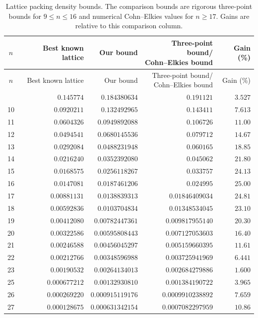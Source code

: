 \documentclass[11pt]{article}
\begin{document}
\begingroup
\small
\setlength{\tabcolsep}{4pt}
\begin{longtable}{crrrr}
\caption{Lattice packing density bounds. The comparison bounds are rigorous
three-point bounds for $9\le n\le16$ and numerical Cohn--Elkies values for
$n\ge17$. Gains are relative to this comparison column.}\label{tab:results}\\
\toprule $n$ & Best known lattice & Our bound & \shortstack{Three-point bound/\\Cohn--Elkies bound} & Gain (\%)\\\midrule
\endfirsthead
\toprule $n$ & Best known lattice & Our bound & \shortstack{Three-point bound/\\Cohn--Elkies bound} & Gain (\%)\\\midrule
\endhead
\bottomrule\endfoot
9 & $0.145774$ & $0.184380634$ & $0.191121$ & $3.527$\\
10 & $0.0920211$ & $0.132492965$ & $0.143411$ & $7.613$\\
11 & $0.0604326$ & $0.0949892088$ & $0.106726$ & $11.00$\\
12 & $0.0494541$ & $0.0680145536$ & $0.079712$ & $14.67$\\
13 & $0.0292084$ & $0.0488231948$ & $0.060165$ & $18.85$\\
14 & $0.0216240$ & $0.0352392080$ & $0.045062$ & $21.80$\\
15 & $0.0168575$ & $0.0256118267$ & $0.033757$ & $24.13$\\
16 & $0.0147081$ & $0.0187461206$ & $0.024995$ & $25.00$\\
17 & $0.00881131$ & $0.0138839313$ & $0.01846409034$ & $24.81$\\
18 & $0.00592836$ & $0.0103704834$ & $0.01348534045$ & $23.10$\\
19 & $0.00412080$ & $0.00782447361$ & $0.009817955140$ & $20.30$\\
20 & $0.00322586$ & $0.00595808443$ & $0.007127053603$ & $16.40$\\
21 & $0.00246588$ & $0.00456045297$ & $0.005159660395$ & $11.61$\\
22 & $0.00212766$ & $0.00348596988$ & $0.003725941969$ & $6.441$\\
23 & $0.00190532$ & $0.00264134013$ & $0.002684279886$ & $1.600$\\
25 & $0.000677212$ & $0.00132930810$ & $0.001384190722$ & $3.965$\\
26 & $0.000269220$ & $0.000915119176$ & $0.0009910238892$ & $7.659$\\
27 & $0.000128675$ & $0.000631342154$ & $0.0007082297959$ & $10.86$\\

\end{longtable}
\end{document}
